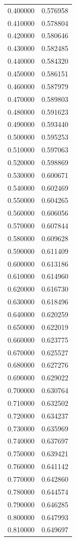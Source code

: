 \begin{tabular}{rr}
0.400000 & 0.576958 \\
0.410000 & 0.578804 \\
0.420000 & 0.580646 \\
0.430000 & 0.582485 \\
0.440000 & 0.584320 \\
0.450000 & 0.586151 \\
0.460000 & 0.587979 \\
0.470000 & 0.589803 \\
0.480000 & 0.591623 \\
0.490000 & 0.593440 \\
0.500000 & 0.595253 \\
0.510000 & 0.597063 \\
0.520000 & 0.598869 \\
0.530000 & 0.600671 \\
0.540000 & 0.602469 \\
0.550000 & 0.604265 \\
0.560000 & 0.606056 \\
0.570000 & 0.607844 \\
0.580000 & 0.609628 \\
0.590000 & 0.611409 \\
0.600000 & 0.613186 \\
0.610000 & 0.614960 \\
0.620000 & 0.616730 \\
0.630000 & 0.618496 \\
0.640000 & 0.620259 \\
0.650000 & 0.622019 \\
0.660000 & 0.623775 \\
0.670000 & 0.625527 \\
0.680000 & 0.627276 \\
0.690000 & 0.629022 \\
0.700000 & 0.630764 \\
0.710000 & 0.632502 \\
0.720000 & 0.634237 \\
0.730000 & 0.635969 \\
0.740000 & 0.637697 \\
0.750000 & 0.639421 \\
0.760000 & 0.641142 \\
0.770000 & 0.642860 \\
0.780000 & 0.644574 \\
0.790000 & 0.646285 \\
0.800000 & 0.647993 \\
0.810000 & 0.649697 \\

\end{tabular}
